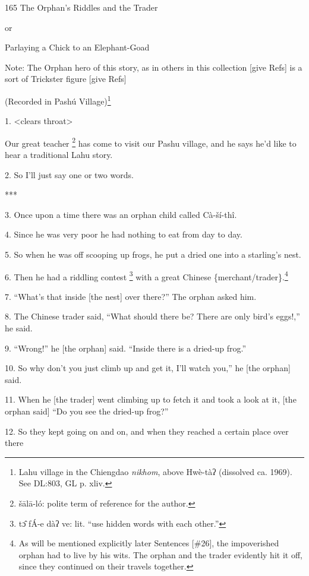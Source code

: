 
165 The Orphan's Riddles and the Trader

or

Parlaying a Chick to an Elephant-Goad

Note: The Orphan hero of this story, as in others in this collection [give Refs]
is a sort of Trickster figure [give Refs]

(Recorded in Pashú Village)\footnote{Lahu village in the Chiengdao \textit{nikhom}, above Hwè-tàʔ (dissolved ca. 1969). See DL:803, GL p. xliv.}

1. <clears throat>

Our great teacher \footnote{šālā-ló: polite term of reference for the author.} has come to visit our Pashu village, and he says he'd like
to hear a traditional Lahu story.

2. So I'll just say one or two words.

***

3. Once upon a time there was an orphan child called Cà-ší-thî.

4. Since he was very poor he had nothing to eat from day to day.

5. So when he was off scooping up frogs, he put a dried one into a starling's nest.

6. Then he had a riddling contest \footnote{tɔ̂ fÁ-e dàʔ ve: lit. ``use hidden words with each other.''} with a great Chinese \{merchant/trader\}.\footnote{As will be mentioned explicitly later Sentences [\#26], the impoverished orphan had to live by his wits. The orphan and the trader evidently hit it off, since they continued on their travels together.}

7. ``What's that inside [the nest] over there?'' The orphan asked him.

8. The Chinese trader said, ``What should there be? There are only bird's eggs!,''
he said.

9. ``Wrong!'' he [the orphan] said. ``Inside there is a dried-up frog.''

10. So why don't you just climb up and get it, I'll watch you,'' he [the orphan]
said.

11. When he [the trader] went climbing up to fetch it and took a look at it, [the
orphan said] ``Do you see the dried-up frog?''

12. So they kept going on and on, and when they reached a certain place over there
